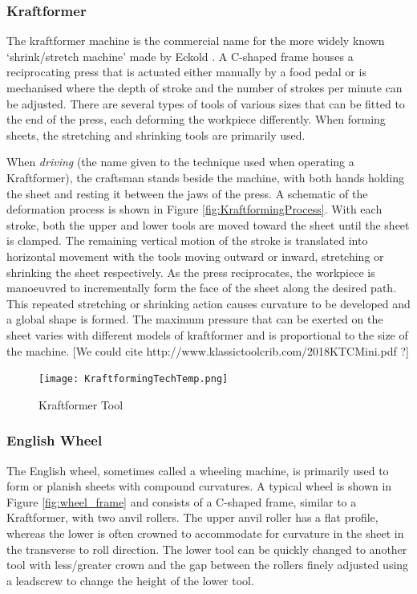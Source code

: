 \subsubsection*{Kraftformer} \label{sec:Kraftformer}

The kraftformer machine is the commercial name for the more widely known `shrink/stretch machine' made by Eckold \citep{Unknown2020ECKOLDBrochure}. A C-shaped frame houses a reciprocating press that is actuated either manually by a food pedal or is mechanised where the depth of stroke and the number of strokes per minute can be adjusted. There are several types of tools of various sizes that can be fitted to the end of the press, each deforming the workpiece differently. When forming sheets, the stretching and shrinking tools are primarily used.

When \textit{driving} (the name given to the technique used when operating a Kraftformer), the craftsman stands beside the machine, with both hands holding the sheet and resting it between the jaws of the press. A schematic of the deformation process is shown in Figure \ref{fig:KraftformingProcess}. With each stroke, both the upper and lower tools are moved toward the sheet until the sheet is clamped. The remaining vertical motion of the stroke is translated into horizontal movement with the tools moving outward or inward, stretching or shrinking the sheet respectively.  As the press reciprocates, the workpiece is manoeuvred to incrementally form the face of the sheet along the desired path. This repeated stretching or shrinking action causes curvature to be developed and a global shape is formed. The maximum pressure that can be exerted on the sheet varies with different models of kraftformer and is proportional to the size of the machine. [We could cite http://www.klassictoolcrib.com/2018KTCMini.pdf ?]


\begin{figure}[h]
    \centering
    \texttt{[image: KraftformingTechTemp.png]}
    \label{fig:Kraftformer}
    \caption{Kraftformer Tool}
\end{figure}






\subsubsection*{English Wheel}

The English wheel, sometimes called a wheeling machine, is primarily used to form or planish sheets with compound curvatures. A typical wheel is shown in Figure \ref{fig:wheel_frame} and consists of a C-shaped frame, similar to a Kraftformer, with two anvil rollers. The upper anvil roller has a flat profile, whereas the lower is often crowned to accommodate for curvature in the sheet in the transverse to roll direction. The lower tool can be quickly changed to another tool with less/greater crown and the gap between the rollers finely adjusted using a leadscrew to change the height of the lower tool.


